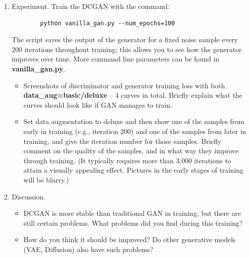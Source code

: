 \documentclass[]{article}
\begin{document}
\begin{enumerate}
    \item Experiment. Train the DCGAN with the command:
    \begin{lstlisting}
        python vanilla_gan.py --num_epochs=100
    \end{lstlisting}
    The script saves the output of the generator for a fixed noise sample every 200 iterations throughout training; this allows you to see how the generator improves over time. More command line parameters can be found in \textbf{vanilla\_gan.py}.
    \begin{itemize}
        \item Screenshots of discriminator and generator training loss with both \textbf{data\_aug=basic/deluxe} – 4 curves in total. Briefly explain what the curves should look like if GAN manages to train.
        \item Set data augmentation to deluxe and then show one of the samples from early in training (e.g., iteration 200) and one of the samples from later in training, and give the iteration number for those samples. Briefly comment on the quality of the samples, and in what way they improve through training. (It typically requires more than 3,000 iterations to attain a visually appealing effect. Pictures in the early stages of training will be blurry.)
        
    \end{itemize}
    \item Discussion. 
        \begin{itemize}
            \item DCGAN is more stable than traditional GAN in training, but there are still certain problems. What problems did you find during this training?
            \item How do you think it should be improved? Do other generative models (VAE, Diffusion) also have such problems?
        \end{itemize}
\end{enumerate}
\end{document}
